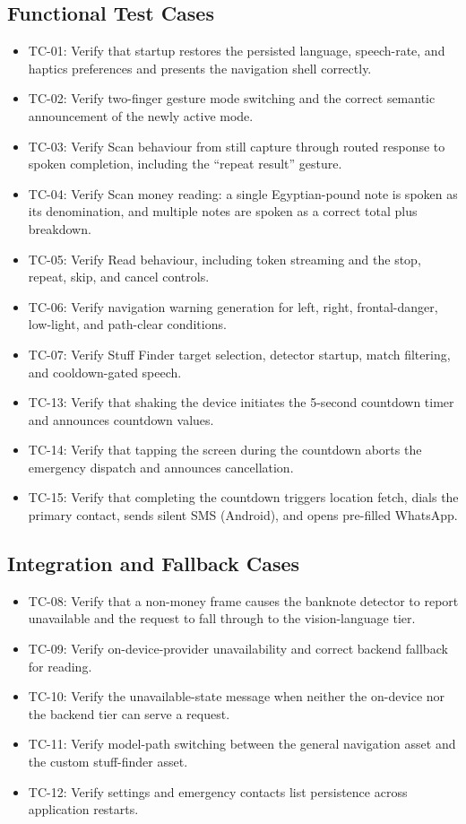 \documentclass[a4paper]{report}
\begin{document}
\subsection{Functional Test Cases}
\begin{itemize}
  \item TC-01: Verify that startup restores the persisted language, speech-rate, and haptics preferences and presents the navigation shell correctly.
  \item TC-02: Verify two-finger gesture mode switching and the correct semantic announcement of the newly active mode.
  \item TC-03: Verify Scan behaviour from still capture through routed response to spoken completion, including the ``repeat result'' gesture.
  \item TC-04: Verify Scan money reading: a single Egyptian-pound note is spoken as its denomination, and multiple notes are spoken as a correct total plus breakdown.
  \item TC-05: Verify Read behaviour, including token streaming and the stop, repeat, skip, and cancel controls.
  \item TC-06: Verify navigation warning generation for left, right, frontal-danger, low-light, and path-clear conditions.
  \item TC-07: Verify Stuff Finder target selection, detector startup, match filtering, and cooldown-gated speech.
  \item TC-13: Verify that shaking the device initiates the 5-second countdown timer and announces countdown values.
  \item TC-14: Verify that tapping the screen during the countdown aborts the emergency dispatch and announces cancellation.
  \item TC-15: Verify that completing the countdown triggers location fetch, dials the primary contact, sends silent SMS (Android), and opens pre-filled WhatsApp.
\end{itemize}

\subsection{Integration and Fallback Cases}
\begin{itemize}
  \item TC-08: Verify that a non-money frame causes the banknote detector to report unavailable and the request to fall through to the vision-language tier.
  \item TC-09: Verify on-device-provider unavailability and correct backend fallback for reading.
  \item TC-10: Verify the unavailable-state message when neither the on-device nor the backend tier can serve a request.
  \item TC-11: Verify model-path switching between the general navigation asset and the custom stuff-finder asset.
  \item TC-12: Verify settings and emergency contacts list persistence across application restarts.
\end{itemize}
\end{document}
